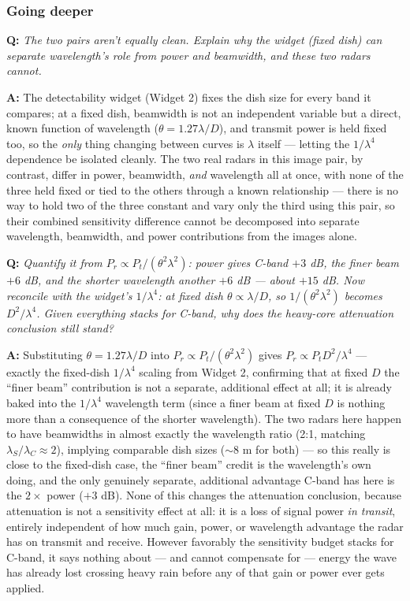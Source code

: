 \documentclass[11pt]{article}
\newenvironment{qa}[1]{\par\noindent\textbf{\color{qgray}Q: }\emph{#1}\par\noindent\textbf{A: }}{\par\vspace{6pt}}
\newcommand{\tier}[1]{\subsubsection*{#1}}
\begin{document}
\tier{Going deeper}
\begin{qa}{The two pairs aren't equally clean. Explain why the widget (fixed dish) can separate wavelength's role from power and beamwidth, and these two radars cannot.}
The detectability widget (Widget 2) fixes the dish size for every band it compares; at a fixed dish, beamwidth is not an independent variable but a direct, known function of wavelength ($\theta=1.27\lambda/D$), and transmit power is held fixed too, so the \emph{only} thing changing between curves is $\lambda$ itself --- letting the $1/\lambda^4$ dependence be isolated cleanly. The two real radars in this image pair, by contrast, differ in power, beamwidth, \emph{and} wavelength all at once, with none of the three held fixed or tied to the others through a known relationship --- there is no way to hold two of the three constant and vary only the third using this pair, so their combined sensitivity difference cannot be decomposed into separate wavelength, beamwidth, and power contributions from the images alone.
\end{qa}
\begin{qa}{Quantify it from $P_r\propto P_t/(\theta^2\lambda^2)$: power gives C-band $+3$ dB, the finer beam $+6$ dB, and the shorter wavelength another $+6$ dB --- about $+15$ dB. Now reconcile with the widget's $1/\lambda^4$: at fixed dish $\theta\propto\lambda/D$, so $1/(\theta^2\lambda^2)$ becomes $D^2/\lambda^4$. Given everything stacks for C-band, why does the heavy-core attenuation conclusion still stand?}
Substituting $\theta=1.27\lambda/D$ into $P_r\propto P_t/(\theta^2\lambda^2)$ gives $P_r\propto P_t D^2/\lambda^4$ --- exactly the fixed-dish $1/\lambda^4$ scaling from Widget 2, confirming that at fixed $D$ the ``finer beam'' contribution is not a separate, additional effect at all; it is already baked into the $1/\lambda^4$ wavelength term (since a finer beam at fixed $D$ is nothing more than a consequence of the shorter wavelength). The two radars here happen to have beamwidths in almost exactly the wavelength ratio (2:1, matching $\lambda_S/\lambda_C\approx2$), implying comparable dish sizes ($\sim$8 m for both) --- so this really is close to the fixed-dish case, the ``finer beam'' credit is the wavelength's own doing, and the only genuinely separate, additional advantage C-band has here is the $2\times$ power ($+3$ dB). None of this changes the attenuation conclusion, because attenuation is not a sensitivity effect at all: it is a loss of signal power \emph{in transit}, entirely independent of how much gain, power, or wavelength advantage the radar has on transmit and receive. However favorably the sensitivity budget stacks for C-band, it says nothing about --- and cannot compensate for --- energy the wave has already lost crossing heavy rain before any of that gain or power ever gets applied.
\end{qa}
\clearpage
\end{document}
